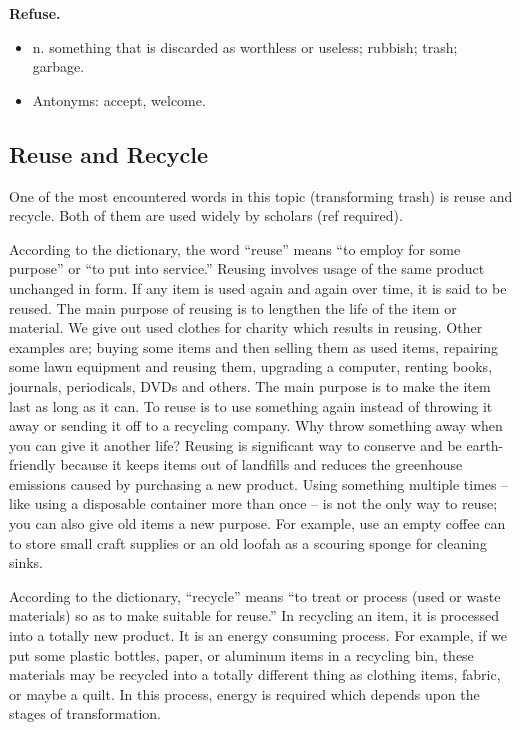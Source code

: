 \textbf{Refuse.}
\begin{itemize}
\item n. something that is discarded as worthless or useless; rubbish; trash; garbage.
\item Antonyms: accept, welcome.
\end{itemize}


\subsection{Reuse and Recycle}
One of the most encountered words in this topic (transforming trash) is reuse and recycle. Both of them are used widely by scholars (ref required).

According to the dictionary, the word “reuse” means “to employ for some purpose” or “to put into service.” Reusing involves usage of the same product unchanged in form. If any item is used again and again over time, it is said to be reused. The main purpose of reusing is to lengthen the life of the item or material. We give out used clothes for charity which results in reusing. Other examples are; buying some items and then selling them as used items, repairing some lawn equipment and reusing them, upgrading a computer, renting books, journals, periodicals, DVDs and others. The main purpose is to make the item last as long as it can. To reuse is to use something again instead of throwing it away or sending it off to a recycling company. Why throw something away when you can give it another life? Reusing is significant way to conserve and be earth-friendly because it keeps items out of landfills and reduces the greenhouse emissions caused by purchasing a new product. Using something multiple times -- like using a disposable container more than once -- is not the only way to reuse; you can also give old items a new purpose. For example, use an empty coffee can to store small craft supplies or an old loofah as a scouring sponge for cleaning sinks.

According to the dictionary, “recycle” means “to treat or process (used or waste materials) so as to make suitable for reuse.” In recycling an item, it is processed into a totally new product. It is an energy consuming process. For example, if we put some plastic bottles, paper, or aluminum items in a recycling bin, these materials may be recycled into a totally different thing as clothing items, fabric, or maybe a quilt. In this process, energy is required which depends upon the stages of transformation.

